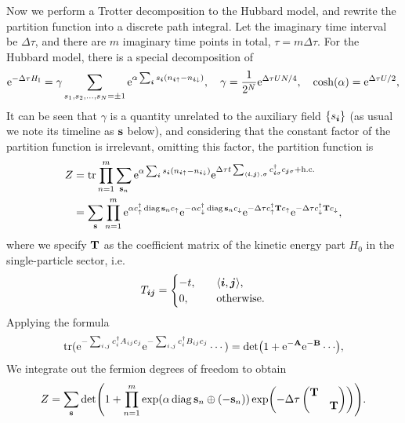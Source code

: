 \documentclass[hyperref, a4paper]{article}
\DeclareMathOperator{\diag}{diag}
\newcommand*{\ee}{\mathrm{e}}
\newcommand*{\pair}[1]{\langle #1 \rangle}
\begin{document}
Now we perform a Trotter decomposition to the Hubbard model, and rewrite the partition function into a discrete path integral. 
Let the imaginary time interval be $\Delta \tau$, and there are $m$ imaginary time points in total, $\tau=m\Delta \tau$.
For the Hubbard model, there is a special decomposition of
\begin{equation}
    \ee^{-\Delta \tau {H}_\text{I}} = \gamma \sum_{s_1, s_2, \ldots, s_N = \pm 1} \ee^{\alpha \sum_{\vb*{i}} s_{\vb*{i}} ({n}_{\vb*{i} \uparrow} - {n}_{\vb*{i} \downarrow})}, 
    \quad \gamma = \frac{1}{2^N} \ee^{\Delta \tau U N / 4}, \quad \cosh(\alpha) = \ee^{\Delta \tau U / 2},
\end{equation}
It can be seen that $\gamma$ is a quantity unrelated to the auxiliary field $\{s_{\vb*{i}}\}$ (as usual we note its timeline as $\vb{s}$ below), and considering that the constant factor of the partition function is irrelevant, omitting this factor, the partition function is
\[
    \begin{aligned}
        Z &= \trace \prod_{n=1}^m \sum_{\vb{s}_{n}} \ee^{\alpha \sum_{\vb*{i}} s_{\vb*{i}} ({n}_{\vb*{i} \uparrow} - {n}_{\vb*{i} \downarrow})} \ee^{\Delta \tau t \sum_{\pair{\vb*{i}, \vb*{j}}, \sigma} {c}_{\vb*{i}\sigma}^\dagger {c}_{\vb*{j}\sigma} + \text{h.c.}} \\
        &= \sum_{\vb{s}} \prod_{n=1}^m \ee^{\alpha {c}^\dagger_{\uparrow} \diag{\vb{s}_n} {c}_{\uparrow}} \ee^{- \alpha {c}^\dagger_{\downarrow} \diag{\vb{s}_n} {c}_{\downarrow}} \ee^{- \Delta \tau {c}_\uparrow^\dagger \vb{T} {c}_\uparrow} \ee^{- \Delta \tau {c}_\downarrow^\dagger \vb{T} {c}_\downarrow},
    \end{aligned}
\]
where we specify $\vb{T}$ as the coefficient matrix of the kinetic energy part ${H}_0$ in the single-particle sector, i.e.
\begin{equation}
    T_{\vb*{i} \vb*{j}} = \begin{cases}
        -t, \quad & \pair{\vb*{i}, \vb*{j}}, \\
        0, \quad & \text{otherwise}.
    \end{cases}
\end{equation}
Applying the formula
\begin{equation}
    \trace(\ee^{- \sum_{i, j} {c}_i^\dagger A_{ij} {c}_j} \ee^{- \sum_{i, j} {c}_i^\dagger B_{ij} {c}_j} \cdots) = \det(1 + \ee^{- \vb{ A}} \ee^{- \vb{B}} \cdots),
    \label{eq:trace-to-det}
\end{equation}
We integrate out the fermion degrees of freedom to obtain
\[
    Z = \sum_{\vb{s}} \det(1 + \prod_{n=1}^m \exp(\alpha \diag{\vb{s}_n \oplus (-\vb{s}_n)}) \exp( -\Delta \tau \pmqty{\dmat{\vb{T}, \vb{T}}})).
\]
\end{document}
